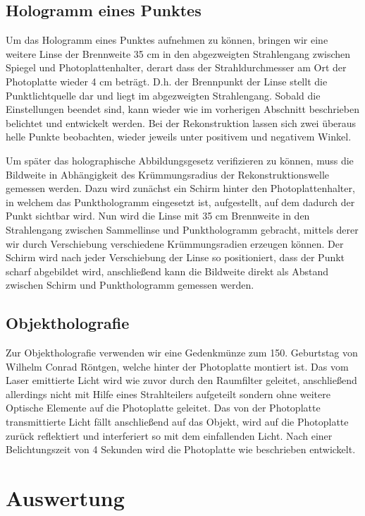 \documentclass[bigchapter,colorback,accentcolor=tud4b,linedtoc,11pt]{tudreport}
\begin{document}
\section{Hologramm eines Punktes}

Um das Hologramm eines Punktes aufnehmen zu können, bringen wir eine weitere Linse der Brennweite 35 cm in den abgezweigten Strahlengang zwischen Spiegel und Photoplattenhalter, derart dass der Strahldurchmesser am Ort der Photoplatte wieder 4 cm beträgt. D.h. der Brennpunkt der Linse stellt die Punktlichtquelle dar und liegt im abgezweigten Strahlengang. Sobald die Einstellungen beendet sind, kann wieder wie im vorherigen Abschnitt beschrieben belichtet und entwickelt werden. Bei der Rekonstruktion lassen sich zwei überaus helle Punkte beobachten, wieder jeweils unter positivem und negativem Winkel.

Um später das holographische Abbildungsgesetz verifizieren zu können, muss die Bildweite in Abhängigkeit des Krümmungsradius der Rekonstruktionswelle gemessen werden. Dazu wird zunächst ein Schirm hinter den Photoplattenhalter, in welchem das Punkthologramm eingesetzt ist, aufgestellt, auf dem dadurch der Punkt sichtbar wird. Nun wird die Linse mit 35 cm Brennweite in den Strahlengang zwischen Sammellinse und Punkthologramm gebracht, mittels derer wir durch Verschiebung verschiedene Krümmungsradien erzeugen können. Der Schirm wird nach jeder Verschiebung der Linse so positioniert, dass der Punkt scharf abgebildet wird, anschließend kann die Bildweite direkt als Abstand zwischen Schirm und Punkthologramm gemessen werden.

\section{Objektholografie}

Zur Objektholografie verwenden wir eine Gedenkmünze zum 150. Geburtstag von
Wilhelm Conrad Röntgen, welche hinter der Photoplatte montiert ist.  Das vom
Laser emittierte Licht wird wie zuvor durch den Raumfilter geleitet,
anschließend allerdings nicht mit Hilfe eines Strahlteilers aufgeteilt sondern
ohne weitere Optische Elemente auf die Photoplatte geleitet. Das von der
Photoplatte transmittierte Licht fällt anschließend auf das Objekt, wird auf die
Photoplatte zurück reflektiert und interferiert so mit dem einfallenden Licht.
Nach einer Belichtungszeit von 4 Sekunden wird die Photoplatte wie beschrieben
entwickelt.

\chapter{Auswertung}
\end{document}
